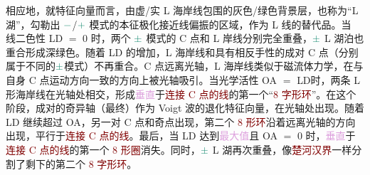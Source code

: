 相应地，就\textcolor{PineGreen}{特征向量}而言，由\textcolor{PineGreen}{虚}/\textcolor{PineGreen}{实} \textcolor{PineGreen}{L 海岸线}包围的灰色/绿色背景层，也称为“\textcolor{PineGreen}{L 湖}”，勾勒出 $\textcolor{PineGreen}{-}$/$\textcolor{PineGreen}{+}$ \textcolor{PineGreen}{模式}的\textcolor{PineGreen}{本征极化}接近\textcolor{PineGreen}{线偏振}的区域，作为 \textcolor{PineGreen}{L 线}\cite{berryOpticalSingularitiesBirefringent2003}的替代品。当 \textcolor{NavyBlue}{线二色性 LD} $=$ 0 时，两个 $\textcolor{PineGreen}{\pm}$ \textcolor{PineGreen}{模式}的 \textcolor{PineGreen}{C 点}和 \textcolor{PineGreen}{L 岸线}分别完全重叠，$\textcolor{PineGreen}{\pm}$ \textcolor{PineGreen}{L 湖泊}也重合形成深绿色。随着 \textcolor{NavyBlue}{LD} 的增加，\textcolor{PineGreen}{L 海岸线}和具有相反\textcolor{NavyBlue}{手性}的成对 \textcolor{PineGreen}{C 点}（分别属于不同的$\textcolor{PineGreen}{\pm}$\textcolor{PineGreen}{模式}）不再重合。\textcolor{PineGreen}{C 点}远离\textcolor{PineGreen}{光轴}，\textcolor{PineGreen}{L 海岸线}类似于\textcolor{NavyBlue}{磁流体力学}，在与自身 \textcolor{PineGreen}{C 点}运动方向一致的方向上被\textcolor{PineGreen}{光轴}吸引。当\textcolor{NavyBlue}{光学活性 OA} $=$ \textcolor{NavyBlue}{LD}时，两条 \textcolor{PineGreen}{L 形海岸线}在\textcolor{PineGreen}{光轴}处相交，形成\textcolor{Plum}{垂直}于\textcolor{Maroon}{连接 C 点的线}的第一个“\textcolor{Maroon}{8 字形环}”。在这个阶段，成对的\textcolor{PineGreen}{奇异轴}（最终）作为 \textcolor{PineGreen}{Voigt 波}的\textcolor{PineGreen}{退化}\textcolor{PineGreen}{特征向量}，在\textcolor{PineGreen}{光轴}处出现。随着 \textcolor{NavyBlue}{LD} 继续超过 \textcolor{NavyBlue}{OA}，另一对 \textcolor{PineGreen}{C 点}和\textcolor{PineGreen}{奇点}出现，第二个 \textcolor{Maroon}{8 形环}沿着远离\textcolor{PineGreen}{光轴}的方向出现，平行于\textcolor{Maroon}{连接 C 点的线}。最后，当 \textcolor{NavyBlue}{LD} 达到\textcolor{Plum}{最大值}且 \textcolor{NavyBlue}{OA} $=$ 0 时，\textcolor{Plum}{垂直}于\textcolor{Maroon}{连接 C 点的线}的第一个 \textcolor{Maroon}{8 形圈}消失。同时，$\textcolor{PineGreen}{\pm}$ \textcolor{PineGreen}{L 湖}再次重叠，像\textcolor{Maroon}{楚河汉界}一样分割了剩下的第二个 \textcolor{Maroon}{8 字形环}。

